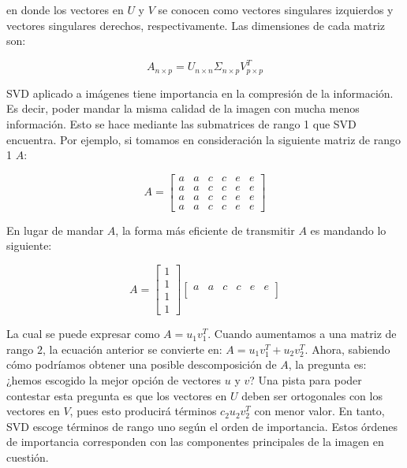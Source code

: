 \documentclass[conference]{IEEEtran}
\begin{document}
en donde los vectores en $U$ y $V$ se conocen como vectores singulares izquierdos y vectores singulares derechos, respectivamente. Las dimensiones de cada matriz son: 

\begin{equation}\label{eq:svd_dimensions}
    A_{n\times p} = U_{n\times n} \Sigma_{n\times p} V_{p\times p}^T
\end{equation}

SVD aplicado a imágenes tiene importancia en la compresión de la información. Es decir, poder mandar la misma calidad de la imagen con mucha menos información. Esto se hace mediante las submatrices de rango 1 que SVD encuentra. Por ejemplo, si tomamos en consideración la siguiente matriz de rango 1 $A$:

\begin{equation*}
    A = \begin{bmatrix}
        a & a & c & c & e & e \\
        a & a & c & c & e & e \\
        a & a & c & c & e & e \\
        a & a & c & c & e & e
    \end{bmatrix}
\end{equation*}

En lugar de mandar $A$, la forma más eficiente de transmitir $A$ es mandando lo siguiente: 

\begin{equation*}
    A = 
\begin{bmatrix}
    1 \\ 1 \\ 1 \\ 1
\end{bmatrix}
\begin{bmatrix}
    a & a & c & c & e & e \\
\end{bmatrix}
\end{equation*}

La cual se puede expresar como $A = u_1v_1^T$. Cuando aumentamos a una matriz de rango $2$, la ecuación anterior se convierte en: $A = u_1v_1^T + u_2v_2^T$. Ahora, sabiendo cómo podríamos obtener una posible descomposición de $A$, la pregunta es: ¿hemos escogido la mejor opción de vectores $u$ y $v$? Una pista para poder contestar esta pregunta es que los vectores en $U$ deben ser ortogonales con los vectores en $V$, pues esto producirá términos $c_2u_2v_2^T$ con menor valor. En tanto, SVD escoge términos de rango uno según el orden de importancia. Estos órdenes de importancia corresponden con las componentes principales de la imagen en cuestión.
\end{document}

